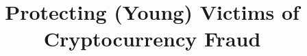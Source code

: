 \documentclass{epsrc}
\newcommand{\1}{1}
\newcommand{\2}{2}
\newcommand{\3}{3}
\newcommand{\4}{4}
\begin{document}
%
\newcommand{\printcntr}{%
  \stepcounter{mycounter}%
  \padzeroes[1]{\decimal{mycounter}}%
}



%
\newcommand{\x}{%
  \stepcounter{mycounterx}%
  \padzeroes[1]{\decimal{mycounterx}}%
}


%
\newcommand{\y}{%
  \stepcounter{mycountery}%
  \padzeroes[1]{\decimal{mycountery}}%
}



%
\title{Protecting (Young) Victims of Cryptocurrency Fraud}
\author{}
\date{}
\maketitle  
\vspace{-21mm}








%















%
%

\end{document}
